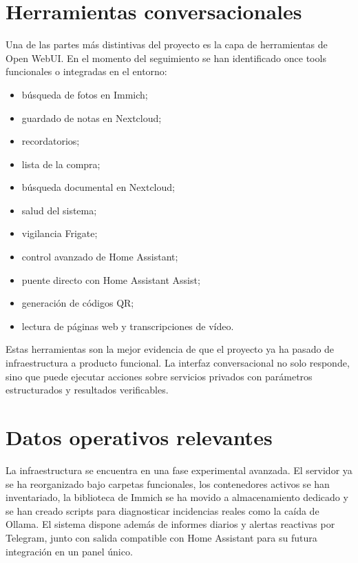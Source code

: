 \section{Herramientas conversacionales}
Una de las partes más distintivas del proyecto es la capa de herramientas de Open WebUI. En el momento del seguimiento se han identificado once tools funcionales o integradas en el entorno:
\begin{itemize}
  \item búsqueda de fotos en Immich;
  \item guardado de notas en Nextcloud;
  \item recordatorios;
  \item lista de la compra;
  \item búsqueda documental en Nextcloud;
  \item salud del sistema;
  \item vigilancia Frigate;
  \item control avanzado de Home Assistant;
  \item puente directo con Home Assistant Assist;
  \item generación de códigos QR;
  \item lectura de páginas web y transcripciones de vídeo.
\end{itemize}

Estas herramientas son la mejor evidencia de que el proyecto ya ha pasado de infraestructura a producto funcional. La interfaz conversacional no solo responde, sino que puede ejecutar acciones sobre servicios privados con parámetros estructurados y resultados verificables.

\section{Datos operativos relevantes}
La infraestructura se encuentra en una fase experimental avanzada. El servidor ya se ha reorganizado bajo carpetas funcionales, los contenedores activos se han inventariado, la biblioteca de Immich se ha movido a almacenamiento dedicado y se han creado scripts para diagnosticar incidencias reales como la caída de Ollama. El sistema dispone además de informes diarios y alertas reactivas por Telegram, junto con salida compatible con Home Assistant para su futura integración en un panel único.

